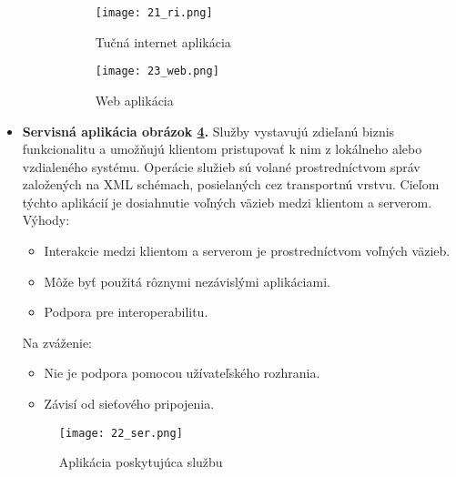 \begin{itemize}
\begin{figure}[h]
\centering
\begin{subfigure}{0.5\linewidth}
\texttt{[image: 21\_ri.png]}
\caption{Tučná internet aplikácia \cite{IOT03}}
\label{21_ri}
\end{subfigure}%
\begin{subfigure}{0.5\linewidth}
\texttt{[image: 23\_web.png]}
\caption{Web aplikácia \cite{IOT03}}
\label{23_web}
\end{subfigure}
\caption{}
\end{figure}

 \item
  \textbf{Servisná aplikácia obrázok \ref{22_ser}.} Služby vystavujú zdieľanú biznis funkcionalitu a umožňujú klientom pristupovať k nim z lokálneho alebo vzdialeného systému. Operácie služieb sú volané prostredníctvom správ založených na XML schémach, posielaných cez transportnú vrstvu. Cieľom týchto aplikácií je dosiahnutie voľných väzieb medzi klientom a serverom. \\
Výhody: 
 \begin{itemize}
   \item Interakcie medzi klientom a serverom je prostredníctvom voľných väzieb.
   \item Môže byť použitá rôznymi nezávislými aplikáciami.
   \item Podpora pre interoperabilitu.
 \end{itemize}
Na zváženie: 
 \begin{itemize}
   \item Nie je podpora pomocou užívateľského rozhrania.
   \item Závisí od sieťového pripojenia.
 \end{itemize} 

\begin{figure}[h]
\centering
\texttt{[image: 22\_ser.png]}
\caption{Aplikácia poskytujúca službu \cite{IOT03}}
\label{22_ser}
\end{figure} 
    
\end{itemize}
